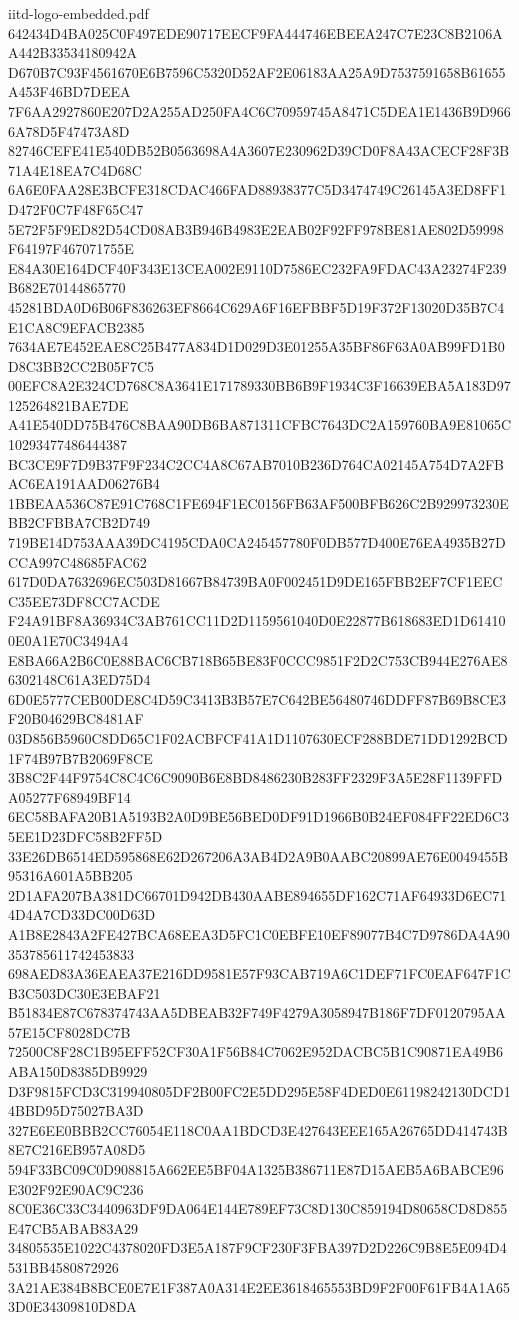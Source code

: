 \begin{filecontents*}[overwrite]{iitd-logo-embedded.pdf}
642434D4BA025C0F497EDE90717EECF9FA444746EBEEA247C7E23C8B2106AA442B33534180942A
D670B7C93F4561670E6B7596C5320D52AF2E06183AA25A9D7537591658B61655A453F46BD7DEEA
7F6AA2927860E207D2A255AD250FA4C6C70959745A8471C5DEA1E1436B9D9666A78D5F47473A8D
82746CEFE41E540DB52B0563698A4A3607E230962D39CD0F8A43ACECF28F3B71A4E18EA7C4D68C
6A6E0FAA28E3BCFE318CDAC466FAD88938377C5D3474749C26145A3ED8FF1D472F0C7F48F65C47
5E72F5F9ED82D54CD08AB3B946B4983E2EAB02F92FF978BE81AE802D59998F64197F467071755E
E84A30E164DCF40F343E13CEA002E9110D7586EC232FA9FDAC43A23274F239B682E70144865770
45281BDA0D6B06F836263EF8664C629A6F16EFBBF5D19F372F13020D35B7C4E1CA8C9EFACB2385
7634AE7E452EAE8C25B477A834D1D029D3E01255A35BF86F63A0AB99FD1B0D8C3BB2CC2B05F7C5
00EFC8A2E324CD768C8A3641E171789330BB6B9F1934C3F16639EBA5A183D97125264821BAE7DE
A41E540DD75B476C8BAA90DB6BA871311CFBC7643DC2A159760BA9E81065C10293477486444387
BC3CE9F7D9B37F9F234C2CC4A8C67AB7010B236D764CA02145A754D7A2FBAC6EA191AAD06276B4
1BBEAA536C87E91C768C1FE694F1EC0156FB63AF500BFB626C2B929973230EBB2CFBBA7CB2D749
719BE14D753AAA39DC4195CDA0CA245457780F0DB577D400E76EA4935B27DCCA997C48685FAC62
617D0DA7632696EC503D81667B84739BA0F002451D9DE165FBB2EF7CF1EECC35EE73DF8CC7ACDE
F24A91BF8A36934C3AB761CC11D2D1159561040D0E22877B618683ED1D614100E0A1E70C3494A4
E8BA66A2B6C0E88BAC6CB718B65BE83F0CCC9851F2D2C753CB944E276AE86302148C61A3ED75D4
6D0E5777CEB00DE8C4D59C3413B3B57E7C642BE56480746DDFF87B69B8CE3F20B04629BC8481AF
03D856B5960C8DD65C1F02ACBFCF41A1D1107630ECF288BDE71DD1292BCD1F74B97B7B2069F8CE
3B8C2F44F9754C8C4C6C9090B6E8BD8486230B283FF2329F3A5E28F1139FFDA05277F68949BF14
6EC58BAFA20B1A5193B2A0D9BE56BED0DF91D1966B0B24EF084FF22ED6C35EE1D23DFC58B2FF5D
33E26DB6514ED595868E62D267206A3AB4D2A9B0AABC20899AE76E0049455B95316A601A5BB205
2D1AFA207BA381DC66701D942DB430AABE894655DF162C71AF64933D6EC714D4A7CD33DC00D63D
A1B8E2843A2FE427BCA68EEA3D5FC1C0EBFE10EF89077B4C7D9786DA4A90353785611742453833
698AED83A36EAEA37E216DD9581E57F93CAB719A6C1DEF71FC0EAF647F1CB3C503DC30E3EBAF21
B51834E87C678374743AA5DBEAB32F749F4279A3058947B186F7DF0120795AA57E15CF8028DC7B
72500C8F28C1B95EFF52CF30A1F56B84C7062E952DACBC5B1C90871EA49B6ABA150D8385DB9929
D3F9815FCD3C319940805DF2B00FC2E5DD295E58F4DED0E61198242130DCD14BBD95D75027BA3D
327E6EE0BBB2CC76054E118C0AA1BDCD3E427643EEE165A26765DD414743B8E7C216EB957A08D5
594F33BC09C0D908815A662EE5BF04A1325B386711E87D15AEB5A6BABCE96E302F92E90AC9C236
8C0E36C33C3440963DF9DA064E144E789EF73C8D130C859194D80658CD8D855E47CB5ABAB83A29
34805535E1022C4378020FD3E5A187F9CF230F3FBA397D2D226C9B8E5E094D4531BB4580872926
3A21AE384B8BCE0E7E1F387A0A314E2EE3618465553BD9F2F00F61FB4A1A653D0E34309810D8DA

\end{filecontents*}

